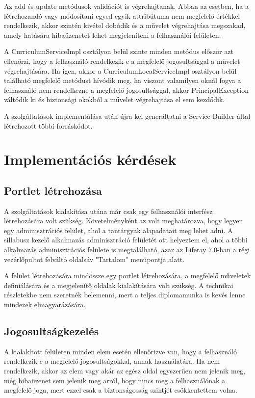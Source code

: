 \documentclass[hidelinks, 12pt, a4paper]{report}
\begin{document}
Az add és update metódusok validációt is végrehajtanak. Abban az esetben, ha a létrehozandó vagy módosítani egyed egyik attribútuma nem megfelelő értékkel rendelkezik, akkor szintén kivétel dobódik és a művelet végrehajtása megszakad, amely hatására hibaüzenetet lehet megjeleníteni a felhasználói felületen.

A CurriculumServiceImpl osztályon belül szinte minden metódus először azt ellenőrzi, hogy a felhasználó rendelkezik-e a megfelelő jogosultsággal a művelet végrehajtására. Ha igen, akkor a CurriculumLocalServiceImpl osztályon belül található megfelelő metódust hívódik meg, ha viszont valamilyen oknál fogva a felhasználó nem rendelkezne a megfelelő jogosultsággal, akkor PrincipalException váltódik ki és biztonsági okokból a művelet végrehajtása el sem kezdődik.

A szolgáltatások implementálása után újra kel generáltatni a Service Builder által létrehozott többi forráskódot.

\section{Implementációs kérdések}

\subsection{Portlet létrehozása}

A szolgáltatások kialakítása utána már csak egy felhasználói interfész létrehozására volt szükség. Követelményként az volt meghatározva, hogy legyen egy adminisztrációs felület, ahol a tantárgyak alapadatait meg lehet adni. A sillabusz kezelő alkalmazás adminisztráció felületét ott helyeztem el, ahol a többi alkalmazás adminisztrációs felülete is megtalálható, azaz az Liferay 7.0-ban a régi vezérlőpultot felváltó oldalsáv "Tartalom" menüpontja alatt.

A felület létrehozására mindössze egy portlet létrehozására, a megfelelő műveletek definiálására és a megjelenítő oldalak kialakítására volt szükség. A technikai részletekbe nem szeretnék belemenni, mert a teljes diplomamunka is kevés lenne mindezek elmagyarázására.

\subsection{Jogosultságkezelés}

A kialakított felületen minden elem esetén ellenőrizve van, hogy a felhasználó rendelkezik-e a megfelelő jogosultságokkal, annak használatára. Ha nem rendelkezik, akkor az elem vagy akár az egész oldal egyszerűen nem jelenik meg, még hibaüzenet sem jelenik meg arról, hogy nincs meg a felhasználónak a megfelelő joga, mert ezzel csak a biztonságosság szintjét csökkentettem volna.
\end{document}
